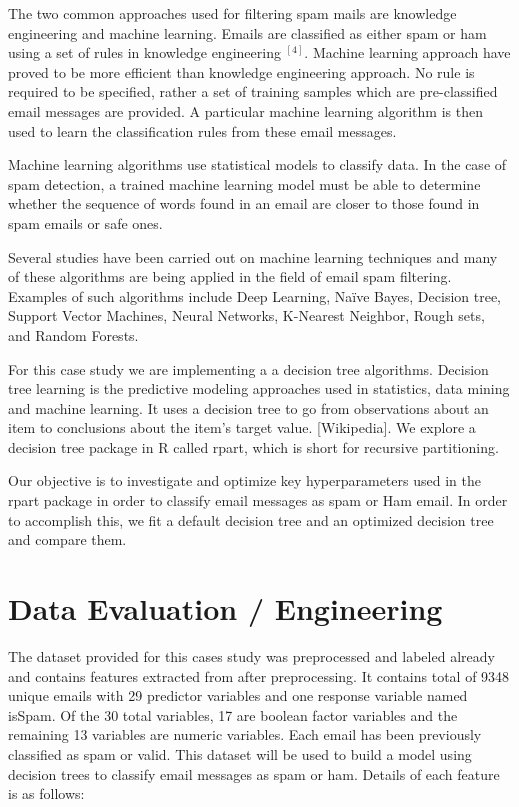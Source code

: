 \documentclass[
]{article}
\begin{document}
The two common approaches used for filtering spam mails are knowledge
engineering and machine learning. Emails are classified as either spam
or ham using a set of rules in knowledge engineering \(^{[4]}\). Machine
learning approach have proved to be more efficient than knowledge
engineering approach. No rule is required to be specified, rather a set
of training samples which are pre-classified email messages are
provided. A particular machine learning algorithm is then used to learn
the classification rules from these email messages.

Machine learning algorithms use statistical models to classify data. In
the case of spam detection, a trained machine learning model must be
able to determine whether the sequence of words found in an email are
closer to those found in spam emails or safe ones.

Several studies have been carried out on machine learning techniques and
many of these algorithms are being applied in the field of email spam
filtering. Examples of such algorithms include Deep Learning, Naïve
Bayes, Decision tree, Support Vector Machines, Neural Networks,
K-Nearest Neighbor, Rough sets, and Random Forests.

For this case study we are implementing a a decision tree algorithms.
Decision tree learning is the predictive modeling approaches used in
statistics, data mining and machine learning. It uses a decision tree to
go from observations about an item to conclusions about the item's
target value. {[}Wikipedia{]}. We explore a decision tree package in R
called rpart, which is short for recursive partitioning.

Our objective is to investigate and optimize key hyperparameters used in
the rpart package in order to classify email messages as spam or Ham
email. In order to accomplish this, we fit a default decision tree and
an optimized decision tree and compare them.

\newpage

\hypertarget{data-evaluation-engineering}{%
\section{Data Evaluation /
Engineering}\label{data-evaluation-engineering}}

The dataset provided for this cases study was preprocessed and labeled
already and contains features extracted from after preprocessing. It
contains total of 9348 unique emails with 29 predictor variables and one
response variable named isSpam. Of the 30 total variables, 17 are
boolean factor variables and the remaining 13 variables are numeric
variables. Each email has been previously classified as spam or valid.
This dataset will be used to build a model using decision trees to
classify email messages as spam or ham. Details of each feature is as
follows:
\end{document}
